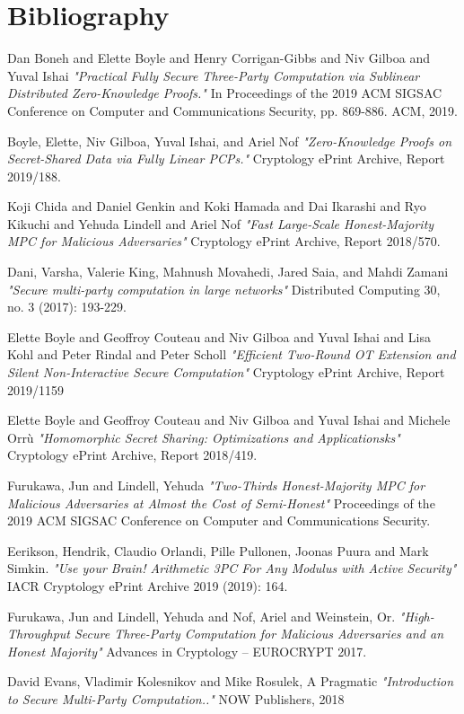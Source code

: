 \documentclass[12pt]{article}
\begin{document}
\section{Bibliography}
\begin{thebibliography}{9}
	
	Dan Boneh and Elette Boyle and Henry Corrigan-Gibbs and Niv Gilboa and Yuval Ishai
	\textit{ "Practical Fully Secure Three-Party Computation via Sublinear Distributed Zero-Knowledge Proofs."}
	In Proceedings of the 2019 ACM SIGSAC Conference on Computer and Communications Security, pp. 869-886. ACM, 2019.
	
	Boyle, Elette, Niv Gilboa, Yuval Ishai, and Ariel Nof
	\textit{ "Zero-Knowledge Proofs on Secret-Shared Data via Fully Linear PCPs."}
	Cryptology ePrint Archive, Report 2019/188.

	Koji Chida and Daniel Genkin and Koki Hamada and Dai Ikarashi and Ryo Kikuchi and Yehuda Lindell and Ariel Nof
	\textit{ "Fast Large-Scale Honest-Majority MPC for Malicious Adversaries"}
	Cryptology ePrint Archive, Report 2018/570.
	
	Dani, Varsha, Valerie King, Mahnush Movahedi, Jared Saia, and Mahdi Zamani
	\textit{ "Secure multi-party computation in large networks"}
	Distributed Computing 30, no. 3 (2017): 193-229.
	
	Elette Boyle and Geoffroy Couteau and Niv Gilboa and Yuval Ishai and Lisa Kohl and Peter Rindal and Peter Scholl
	\textit{ "Efficient Two-Round OT Extension and Silent Non-Interactive Secure Computation"}
	Cryptology ePrint Archive, Report 2019/1159
	
	Elette Boyle and Geoffroy Couteau and Niv Gilboa and Yuval Ishai and Michele Orrù
	\textit{ "Homomorphic Secret Sharing: Optimizations and Applicationsks"}
	Cryptology ePrint Archive, Report 2018/419.
	
	Furukawa, Jun and Lindell, Yehuda
	\textit{ "Two-Thirds Honest-Majority MPC for Malicious Adversaries at Almost the Cost of Semi-Honest"}
	Proceedings of the 2019 ACM SIGSAC Conference on Computer and Communications Security.
	
	Eerikson, Hendrik, Claudio Orlandi, Pille Pullonen, Joonas Puura and Mark Simkin.
	\textit{ "Use your Brain! Arithmetic 3PC For Any Modulus with Active Security"}
	IACR Cryptology ePrint Archive 2019 (2019): 164.

	Furukawa, Jun and Lindell, Yehuda and Nof, Ariel and Weinstein, Or.
	\textit{ "High-Throughput Secure Three-Party Computation for Malicious Adversaries and an Honest Majority"}
	Advances in Cryptology – EUROCRYPT 2017.

	 David Evans, Vladimir Kolesnikov and Mike Rosulek, A Pragmatic 	
	\textit{ "Introduction to Secure Multi-Party Computation.."}
	 NOW Publishers, 2018
	
\end{thebibliography}
\pagebreak
\end{document}
